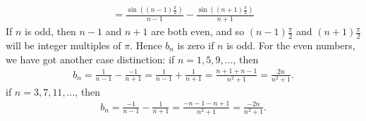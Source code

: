 \documentclass[11pt]{article}
\begin{document}
\begin{solution}
\begin{itemize}
\begin{align*}
        =
        \frac{\sin((n-1)\frac{\pi}{2})}{n-1} - \frac{\sin((n+1)\frac{\pi}{2})}{n+1}
    \end{align*}
    If $n$ is odd, then $n-1$ and $n+1$ are both even, and so $(n-1)\frac{\pi}{2}$ and $(n+1)\frac{\pi}{2}$ will be integer multiples of $\pi$. 
    Hence $b_n$ is zero if $n$ is odd. 
    For the even numbers, we have got another case distinction:
    if $n=1,5,9,\dots$, then 
    \begin{align*}
        b_n = \frac{1}{n-1} - \frac{-1}{n+1} = \frac{1}{n-1} + \frac{1}{n+1} = \frac{n+1+n-1}{n^2+1} = \frac{2n}{n^2+1}.
    \end{align*}
    if $n=3,7,11,\dots$, then 
    \begin{align*}
        b_n = \frac{-1}{n-1} - \frac{1}{n+1} = \frac{-n-1-n+1}{n^2+1} = \frac{-2n}{n^2+1}.
    \end{align*}
    

    
\end{itemize}
\end{solution}
\end{document}

